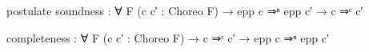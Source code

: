 
%
\begin{center}\begin{code}[hide]
postulate
  soundness : ∀ {F} (c c′ : Choreo F) →
    epp c ⇒ⁿ epp c′ → c ⇒ᶜ c′

  completeness : ∀ {F} (c c′ : Choreo F) →
    c ⇒ᶜ c′ → epp c ⇒ⁿ epp c′
\end{code}\end{center}
%
